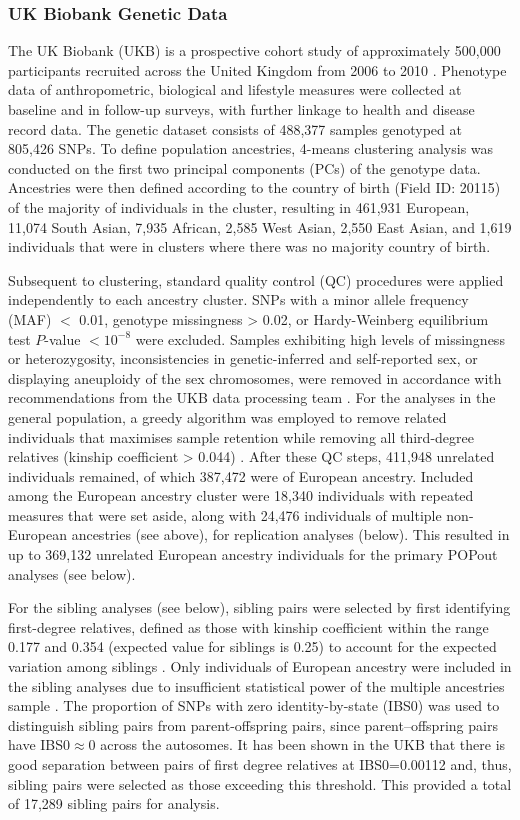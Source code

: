 \documentclass[12pt]{zHenriquesLab-StyleBioRxiv}
\begin{document}
{{\subsubsection*{UK Biobank Genetic Data} 
The UK Biobank (UKB) is a prospective cohort study of approximately
500,000 participants recruited across the United Kingdom from 2006 to
2010 \cite{ukb}. Phenotype data of anthropometric, biological and
lifestyle measures were collected at baseline and in follow-up surveys, with
further linkage to health and disease record data. The genetic dataset
consists of 488,377 samples genotyped at 805,426 SNPs.
To define population ancestries, 4-means clustering analysis was
conducted on the first two principal components (PCs) of the genotype
data. Ancestries were then defined according to the country of 
birth (Field ID: 20115) of the majority of individuals in the cluster, resulting in 
461,931 European, 11,074 South Asian, 7,935 African, 2,585 West Asian, 
2,550 East Asian, and 1,619 individuals that were in clusters where there was 
no majority country of birth.

Subsequent to clustering, standard quality control (QC) procedures
were applied independently to each ancestry cluster. SNPs with a minor
allele frequency (MAF) $<$ 0.01, genotype missingness > 0.02, or
Hardy-Weinberg equilibrium test $P$-value $< 10^{-8}$ were
excluded. Samples exhibiting high levels of missingness or
heterozygosity, inconsistencies in genetic-inferred and self-reported
sex, or displaying aneuploidy of the sex chromosomes, were removed in
accordance with recommendations from the UKB data processing team
\cite{ukb_qc}.  For the analyses in the general population, a greedy
algorithm was employed to remove related individuals that maximises
sample retention while removing all third-degree relatives (kinship
coefficient > 0.044) \cite{erase}.  After these QC steps, 411,948 unrelated    %
individuals remained, of which 387,472 were of European ancestry. Included 
among the European ancestry cluster were 18,340 individuals with repeated 
measures that were set aside, along with 24,476 individuals of multiple 
non-European ancestries (see above), for replication analyses (below). This resulted in up to 369,132 
unrelated European ancestry individuals for the primary POPout analyses (see below). 

For the sibling analyses (see below), sibling pairs were selected by first
identifying first-degree relatives, defined as those with kinship
coefficient within the range 0.177 and 0.354 (expected value for
siblings is 0.25) to account for the expected variation among siblings \cite{sib1}. 
Only individuals of European ancestry were included in the sibling analyses due to 
insufficient statistical power of the multiple ancestries sample \cite{Souaiaia2024}. 
The proportion of SNPs with zero identity-by-state (IBS0) was used to distinguish 
sibling pairs from parent-offspring pairs, since parent–offspring pairs have
IBS0$\approx$0 across the autosomes. It has been shown in the UKB that
there is good separation between pairs of first degree relatives at
IBS0=0.00112 \cite{sib1} and, thus, sibling pairs were selected as
those exceeding this threshold. This provided a total of 17,289 sibling pairs 
for analysis.

}}
\end{document}
